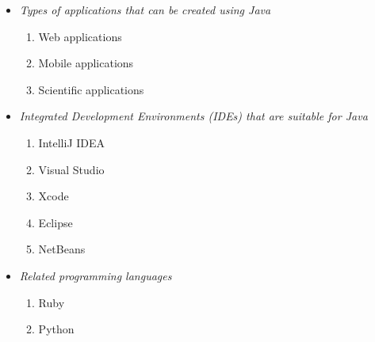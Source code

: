 \documentclass{article}
\begin{document}
	
	\begin{itemize}
		\item \textit{Types of applications that can be created using Java}
		\begin{enumerate}
			\item Web applications
			\item Mobile applications
			\item Scientific applications
		\end{enumerate}
	\item \textit{Integrated Development Environments (IDEs) that are suitable for Java}
	\begin{enumerate}
		\item IntelliJ IDEA
		\item Visual Studio
		\item Xcode
		\item Eclipse
		\item NetBeans
	\end{enumerate}
     \item \textit{Related programming languages}
     \begin{enumerate}
     	\item Ruby
     	\item Python
     \end{enumerate}
 \end{itemize}
\end{document}
